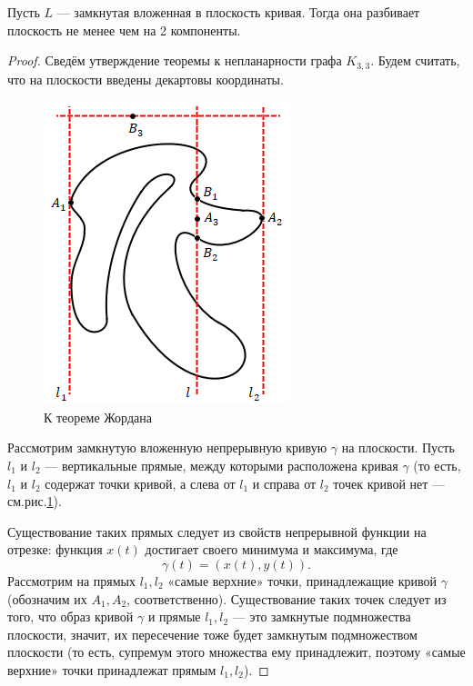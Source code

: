 \begin{statement}
    Пусть $L$ — замкнутая вложенная в плоскость кривая. Тогда она разбивает плоскость не менее чем на 2 компоненты.
\end{statement}
\begin{proof}
    Сведём утверждение теоремы к непланарности графа $K_{3,3}$. Будем считать, что на плоскости введены декартовы координаты.
    \begin{figure}[h]
        \centering
        \includegraphics[scale=0.8]{images/c5.3.png}
        \caption{К теореме Жордана}
        \label{fig:c5.3}
    \end{figure}
    Рассмотрим замкнутую вложенную непрерывную кривую $\gamma$ на плоскости. Пусть $l_1$ и $l_2$ — вертикальные прямые, между которыми расположена кривая $\gamma$ (то есть, $l_1$ и $l_2$ содержат точки кривой, а слева от $l_1$ и справа от $l_2$ точек кривой нет — см.рис.\ref{fig:c5.3}).

    Существование таких прямых следует из свойств непрерывной функции на отрезке: функция $x(t)$ достигает своего минимума и максимума, где \[\gamma(t) = \left(x(t), y(t)\right).\]
    Рассмотрим на прямых $l_1, l_2$ «самые верхние» точки, принадлежащие кривой $\gamma$ (обозначим их $A_1, A_2$, соответственно). Существование таких точек следует из того, что образ кривой $\gamma$ и прямые $l_1, l_2$ — это замкнутые подмножества плоскости, значит, их пересечение тоже будет замкнутым подмножеством плоскости (то есть, супремум этого множества ему принадлежит, поэтому «самые верхние» точки принадлежат прямым $l_1, l_2$).


\end{proof}
